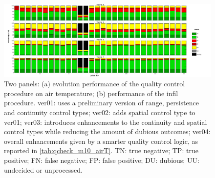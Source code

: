 \documentclass[authoryear,preprint,review,12pt]{elsarticle}
\begin{document}
\begin{figure}
	\centering
	\includegraphics[scale=.30]{figures/Fig_qck_versions.tif}
	\caption{ Two panels: (a) evolution performance of the quality control procedure on air temperature; (b) performance of the infil procedure.
    ver01: uses a preliminary version of range, persistence and continuity control types; ver02: adds spatial control type to ver01; ver03: introduces enhancements to the continuity and spatial control types while reducing the amount of dubious outcomes; ver04: overall enhancements given by a smarter quality control logic, as reported in \cref{tab:qcheck_m10_airT}. TN: true negative; TP: true positive; FN: false negative; FP: false positive; DU: dubious; UU: undecided or unprocessed. }
	\label{fig:perturbationCharts}
\end{figure}


\end{document}
